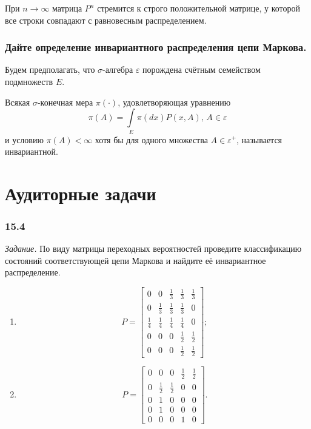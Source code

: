 При $n \to \infty $ матрица $P^n$ стремится к строго положительной матрице,
у которой все строки совпадают с равновесным распределением.

\subsubsection*{Дайте определение инвариантного распределения цепи Маркова.}

Будем предполагать,
что $ \sigma $-алгебра $ \varepsilon $ порождена счётным семейством подмножеств $E$.

Всякая $ \sigma $-конечная мера $ \pi \left( \cdot \right) $, удовлетворяющая уравнению
\begin{equation*}
  \pi \left( A \right) = \int \limits_{E} \pi \left( dx \right) P \left( x, A \right), \,
  A \in \varepsilon
\end{equation*}
и условию $ \pi \left( A \right) < \infty $ хотя бы для одного множества $A \in \varepsilon^+$,
называется инвариантной.

\section*{Аудиторные задачи}

\subsubsection*{15.4}

\textit{Задание.}
По виду матрицы переходных вероятностей проведите классификацию состояний соответствующей цепи
Маркова и найдите её инвариантное распределение.
\begin{enumerate}[label=\alph*)]
  \item \begin{equation*}
    P =
    \begin{bmatrix}
      0 & 0 & \frac{1}{3} & \frac{1}{3} & \frac{1}{3} \\
      0 & \frac{1}{3} & \frac{1}{3} & \frac{1}{3} & 0 \\
      \frac{1}{4} & \frac{1}{4} & \frac{1}{4} & \frac{1}{4} & 0 \\
      0 & 0 & 0 & \frac{1}{2} & \frac{1}{2} \\
      0 & 0 & 0 & \frac{1}{2} & \frac{1}{2}
    \end{bmatrix};
  \end{equation*}
  \item \begin{equation*}
      P =
      \begin{bmatrix}
        0 & 0 & 0 & \frac{1}{2} & \frac{1}{2} \\
        0 & \frac{1}{2} & \frac{1}{2} & 0 & 0 \\
        0 & 1 & 0 & 0 & 0 \\
        0 & 1 & 0 & 0 & 0 \\
        0 & 0 & 0 & 1 & 0
      \end{bmatrix}.
  \end{equation*}
\end{enumerate}

